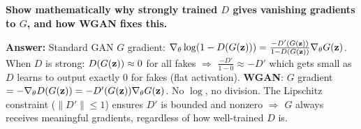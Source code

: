 \begin{examq}
\textbf{Show mathematically why strongly trained $D$ gives vanishing gradients to $G$, and how WGAN fixes this.}

\textbf{Answer:} Standard GAN $G$ gradient: $\nabla_\theta \log(1-D(G(\mathbf{z}))) = \frac{-D'(G(\mathbf{z}))}{1-D(G(\mathbf{z}))} \nabla_\theta G(\mathbf{z})$. When $D$ is strong: $D(G(\mathbf{z})) \approx 0$ for all fakes $\Rightarrow$ $\frac{-D'}{1-0} \approx -D'$ which gets small as $D$ learns to output exactly 0 for fakes (flat activation). \textbf{WGAN}: $G$ gradient $= -\nabla_\theta D(G(\mathbf{z})) = -D'(G(\mathbf{z}))\nabla_\theta G(\mathbf{z})$. No $\log$, no division. The Lipschitz constraint ($\|D'\| \leq 1$) ensures $D'$ is bounded and nonzero $\Rightarrow$ $G$ always receives meaningful gradients, regardless of how well-trained $D$ is.
\end{examq}
